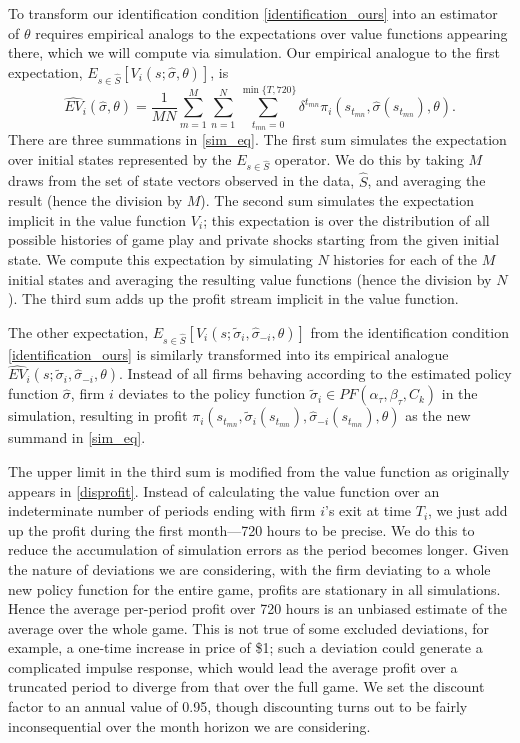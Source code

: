 \documentclass[11pt]{article}
\begin{document}
To transform our identification condition \eqref{identification_ours}
into an estimator of $\theta$ requires empirical analogs to the
expectations over value functions appearing there, which we will
compute via simulation. Our empirical analogue to the first
expectation, $E_{s\in\hat{S}} [ V_{i}(s;\hat{\sigma},\theta )]$, is
\begin{equation}
\label{sim_eq}
\widehat{EV}_i (\hat{\sigma},\theta ) = \frac{1}{MN} \sum_{m = 1}^M
\sum_{n=1}^N \sum_{t_{mn}=0}^{\min\{T,720\}} \delta^{t_{mn}}
\pi_i(s_{t_{mn}}, \hat{\sigma}(s_{t_{mn}}),\theta).
\end{equation}
There are three summations in \eqref{sim_eq}. The first sum simulates
the expectation over initial states represented by the
$E_{s\in\hat{S}}$ operator. We do this by taking $M$ draws from the
set of state vectors observed in the data, $\hat{S}$, and averaging
the result (hence the division by $M$). The second sum simulates the
expectation implicit in the value function $V_i$; this expectation is
over the distribution of all possible histories of game play and
private shocks starting from the given initial state. We compute this
expectation by simulating $N$ histories for each of the $M$ initial
states and averaging the resulting value functions (hence the division
by $N$). The third sum adds up the profit stream implicit in the value
function.

The other expectation, $E_{s\in\hat{S}} [V_i(s;\tilde{\sigma}_i,
  \hat{\sigma}_{-i}, \theta )]$ from the identification condition
\eqref{identification_ours} is similarly transformed into its
empirical analogue $\widehat{EV}_i (s;\tilde{\sigma}_i,
\hat{\sigma}_{-i}, \theta )$. Instead of all firms behaving according
to the estimated policy function $\hat{\sigma}$, firm $i$ deviates to
the policy function $\tilde{\sigma}_i \in
PF(\alpha_{\tau},\beta_{\tau},C_k)$ in the simulation, resulting in
profit $\pi_i(s_{t_{mn}}, \tilde{\sigma}_i(s_{t_{mn}}),
\hat{\sigma}_{-i}(s_{t_{mn}}),\theta)$ as the new summand in
\eqref{sim_eq}.

The upper limit in the third sum is modified from the value function
as originally appears in \eqref{disprofit}. Instead of calculating the
value function over an indeterminate number of periods ending with
firm $i$'s exit at time $T_i$, we just add up the profit during the
first month---720 hours to be precise. We do this to reduce the
accumulation of simulation errors as the period becomes longer. Given
the nature of deviations we are considering, with the firm deviating
to a whole new policy function for the entire game, profits are
stationary in all simulations. Hence the average per-period profit
over 720 hours is an unbiased estimate of the average over the whole
game. This is not true of some excluded deviations, for example, a
one-time increase in price of \$1; such a deviation could generate a
complicated impulse response, which would lead the average profit over
a truncated period to diverge from that over the full game. We set the
discount factor to an annual value of 0.95, though discounting turns
out to be fairly inconsequential over the month horizon we are
considering.
\end{document}
